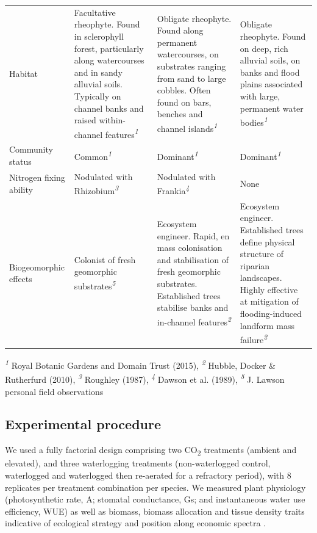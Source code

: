 \documentclass[12pt,a4paper]{memoir}
\begin{document}
\begin{tiny}
\begin{threeparttable}[h!]
\begin{tabularx}{\textwidth}{XXXX}
Habitat & Facultative rheophyte. Found in sclerophyll forest, particularly along watercourses and in sandy alluvial soils. Typically on channel banks and raised within-channel features\textit{\textsuperscript{1}} & Obligate rheophyte. Found along permanent watercourses, on substrates ranging from sand to large cobbles. Often found on bars, benches and channel islands\textit{\textsuperscript{1}} & Obligate rheophyte. Found on deep, rich alluvial soils, on banks and flood plains associated with large, permanent water bodies\textit{\textsuperscript{1}} \\ 
Community status & Common\textit{\textsuperscript{1}} & Dominant\textit{\textsuperscript{1}} & Dominant\textit{\textsuperscript{1}} \\ \hline
Nitrogen fixing ability & Nodulated with Rhizobium\textit{\textsuperscript{3}} & Nodulated with Frankia\textit{\textsuperscript{4}} & None \\ \hline
Biogeomorphic effects & Colonist of fresh geomorphic substrates\textit{\textsuperscript{5}} & Ecosystem engineer. Rapid, en mass colonisation and stabilisation of fresh geomorphic substrates. Established trees stabilise banks and in-channel features\textit{\textsuperscript{2}} & Ecosystem engineer. Established trees define physical structure of riparian landscapes. Highly effective at mitigation of flooding-induced landform mass failure\textit{\textsuperscript{2}} \\ \hline
\end{tabularx}
  \begin{tablenotes}
    \item \textit{\textsuperscript{1}} Royal Botanic Gardens and Domain Trust (2015), \textit{\textsuperscript{2}} Hubble, Docker & Rutherfurd (2010), \textit{\textsuperscript{3}} Roughley (1987), \textit{\textsuperscript{4}} Dawson et al. (1989), \textit{\textsuperscript{5}} J. Lawson personal field observations
  \end{tablenotes}
\end{threeparttable}
\end{tiny}
%
\subsection*{Experimental procedure}
We used a fully factorial design comprising two CO\textsubscript{2} treatments (ambient and elevated), and three waterlogging treatments (non-waterlogged control, waterlogged and waterlogged then re-aerated for a refractory period), with 8 replicates per treatment combination per species. We measured plant physiology (photosynthetic rate, A; stomatal conductance, Gs; and instantaneous water use efficiency, WUE) as well as biomass, biomass allocation and tissue density traits indicative of ecological strategy and position along economic spectra \citep{Reich2014}.
\end{document}
